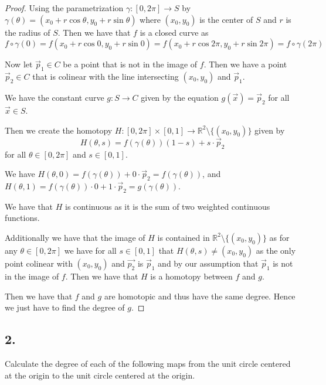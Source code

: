 \documentclass{amsart}
\theoremstyle{plain}
\theoremstyle{definition}
\theoremstyle{remark}
\begin{document}
\begin{proof}
    Using the parametrization $\gamma:[0,2\pi]\to S$ by $\gamma(\theta)=(x_0+r\cos \theta, y_0 +r\sin \theta )$ where $(x_0,y_0)$ is the center of $S$ and $r$ is the radius of $S$. Then we have that $f$ is a closed curve as $$f\circ \gamma(0)=f(x_0+r\cos 0, y_0 +r\sin 0)=f(x_0+r\cos 2\pi , y_0 +r\sin 2\pi)=f\circ \gamma(2\pi)$$
    
    Now let $\vec p_1\in C$ be a point that is not in the image of $f$. Then we have a point $\vec p_2\in C$ that is colinear with the line intersecting $(x_0,y_0)$ and $\vec p_1$. 

    We have the constant curve $g: S \to C$ given by the equation $g(\vec x) = \vec p_2$ for all $\vec x\in S$. 
    
    
    Then we create the homotopy $H:[0,2\pi]\times [0,1]\to \mathbb{R}^2\setminus \{(x_0,y_0)\}$ given by $$H(\theta,s)=f(\gamma (\theta))(1-s)+s\cdot \vec p_2$$ for all $\theta \in [0,2\pi]$ and $s\in [0,1]$. 

    We have $H(\theta,0)=f(\gamma (\theta))+0\cdot \vec p_2=f(\gamma(\theta))$, and $H(\theta,1)=f(\gamma(\theta ))\cdot 0 + 1\cdot \vec p_2=g(\gamma (\theta))$. 

    We have that $H$ is continuous as it is the sum of two weighted continuous functions. 
    
    Additionally we have that the image of $H$ is contained in $\mathbb{R}^2\setminus \{(x_0,y_0)\}$ as for any $\theta\in [0,2\pi]$ we have for all $s\in[0,1]$ that $H(\theta,s)\neq (x_0,y_0)$ as the only point colinear with  $(x_0,y_0)$ and $\vec{p_2}$ is $\vec p_1$ and by our assumption that $\vec p_1$ is not in the image of $f$. Then we have that $H$ is a homotopy between $f$ and $g$. 

    Then we have that $f$ and $g$ are homotopic and thus have the same degree. Hence we just have to find the degree of $g$. 

    

\end{proof}





\vspace{.15in}
\noindent
\subsection*{2.} Calculate the degree of each of the following maps from the unit circle centered at the origin to the unit circle centered at the origin. 
\end{document}
